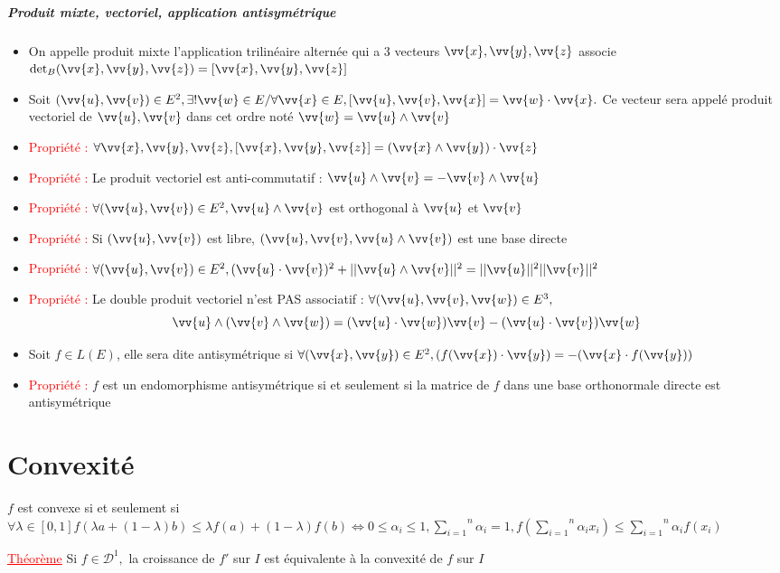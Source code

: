 \documentclass[a4paper, french]{article}
\newcommand{\p}{\wedge}
\newcommand{\D}{\mathcal{D}}
\newcommand{\al}{\alpha}
\newcommand{\la}{\lambda}
\newcommand{\som}[2]{\overset{#2}{\underset{#1}{\sum}}}
\newcommand{\thm}{\textcolor{red}{\underline{Théorème} }}
\newcommand{\ppt}{\textcolor{red}{Propriété : }}
\begin{document}
	 \subparagraph{Produit mixte, vectoriel, application antisymétrique}
	 \begin{itemize}[label=\(\bullet\)]
		\item On appelle produit mixte l'application trilinéaire alternée qui a 3 vecteurs $\vv{x}, \vv{y}, \vv{z}$ associe $\det_B(\vv{x},\vv{y},\vv{z})=[\vv{x},\vv{y},\vv{z}]$
		\item Soit $(\vv{u},\vv{v}) \in E^2, \exists! \vv{w} \in E / \forall \vv{x} \in E, [\vv{u},\vv{v},\vv{x}]=\vv{w}\cdot\vv{x}.$ Ce vecteur sera appelé produit vectoriel de $\vv{u},\vv{v}$ dans cet ordre noté $\vv{w}=\vv{u}\p\vv{v}$
		\item \ppt $\forall \vv{x},\vv{y},\vv{z}, [\vv{x},\vv{y},\vv{z}]=(\vv{x}\p\vv{y})\cdot\vv{z}$
		\item \ppt Le produit vectoriel est anti-commutatif : $\vv{u}\p\vv{v}=-\vv{v}\p\vv{u}$
		\item \ppt $\forall (\vv{u},\vv{v}) \in E^2, \vv{u}\p\vv{v}$ est orthogonal à $\vv{u}$ et $\vv{v}$
		\item \ppt Si $(\vv{u},\vv{v})$ est libre, $(\vv{u},\vv{v},\vv{u}\p\vv{v})$ est une base directe
		\item \ppt $\forall (\vv{u},\vv{v}) \in E^2, (\vv{u}\cdot\vv{v})^2+||\vv{u}\p\vv{v}||^2=||\vv{u}||^2||\vv{v}||^2$
		\item \ppt Le double produit vectoriel n'est PAS associatif : \(\forall (\vv{u},\vv{v},\vv{w}) \in E^3,\)
	  \[\vv{u}\p (\vv{v} \p \vv{w})=(\vv{u} \cdot \vv{w})\vv{v}-(\vv{u} \cdot \vv{v})\vv{w}\]
		\item Soit $f \in L(E)$, elle sera dite antisymétrique si $\forall (\vv{x},\vv{y}) \in E^2, (f(\vv{x})\cdot\vv{y})=-(\vv{x}\cdot f(\vv{y}))$
		\item \ppt $f$ est un endomorphisme antisymétrique si et seulement si la matrice de $f$ dans une base orthonormale directe est antisymétrique
	 \end{itemize}


	 \section{Convexité}
	  $f$ est convexe si et seulement si $\forall \la \in [0,1] f(\la a+(1-\la)b) \leqslant \la f(a)+(1-\la)f(b) \iff {0 \leqslant \al_i \leqslant 1,} \som{i=1}{n}\al_i=1, f(\som{i=1}{n}\al_i x_i) \leqslant \som{i=1}{n}\al_i f(x_i)$ 
	 
	  \thm Si $f \in \D^1,$ la croissance de $f'$ sur $I$ est équivalente à la convexité de $f$ sur $I$ 
	 
\end{document}
